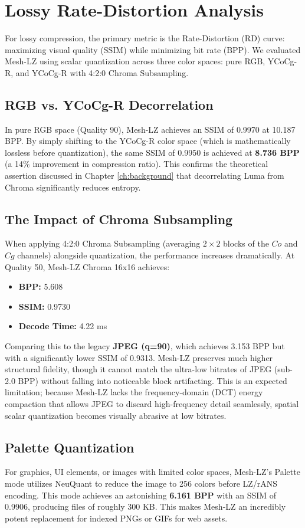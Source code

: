 \section{Lossy Rate-Distortion Analysis}

For lossy compression, the primary metric is the Rate-Distortion (RD) curve: maximizing visual quality (SSIM) while minimizing bit rate (BPP). We evaluated Mesh-LZ using scalar quantization across three color spaces: pure RGB, YCoCg-R, and YCoCg-R with 4:2:0 Chroma Subsampling.

\subsection{RGB vs. YCoCg-R Decorrelation}
In pure RGB space (Quality 90), Mesh-LZ achieves an SSIM of 0.9970 at 10.187 BPP. By simply shifting to the YCoCg-R color space (which is mathematically lossless before quantization), the same SSIM of 0.9950 is achieved at \textbf{8.736 BPP} (a 14\% improvement in compression ratio). This confirms the theoretical assertion discussed in Chapter \ref{ch:background} that decorrelating Luma from Chroma significantly reduces entropy.

\subsection{The Impact of Chroma Subsampling}
When applying 4:2:0 Chroma Subsampling (averaging $2 \times 2$ blocks of the $Co$ and $Cg$ channels) alongside quantization, the performance increases dramatically. 
At Quality 50, Mesh-LZ Chroma 16x16 achieves:
\begin{itemize}
    \item \textbf{BPP:} 5.608
    \item \textbf{SSIM:} 0.9730
    \item \textbf{Decode Time:} 4.22 ms
\end{itemize}

Comparing this to the legacy \textbf{JPEG (q=90)}, which achieves 3.153 BPP but with a significantly lower SSIM of 0.9313. Mesh-LZ preserves much higher structural fidelity, though it cannot match the ultra-low bitrates of JPEG (sub-2.0 BPP) without falling into noticeable block artifacting. This is an expected limitation; because Mesh-LZ lacks the frequency-domain (DCT) energy compaction that allows JPEG to discard high-frequency detail seamlessly, spatial scalar quantization becomes visually abrasive at low bitrates.

\subsection{Palette Quantization}
For graphics, UI elements, or images with limited color spaces, Mesh-LZ's Palette mode utilizes NeuQuant to reduce the image to 256 colors before LZ/rANS encoding. This mode achieves an astonishing \textbf{6.161 BPP} with an SSIM of 0.9906, producing files of roughly 300 KB. This makes Mesh-LZ an incredibly potent replacement for indexed PNGs or GIFs for web assets.

